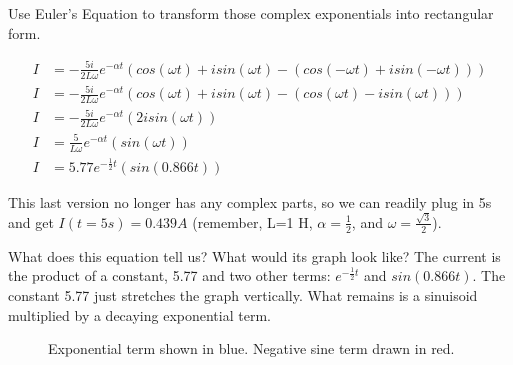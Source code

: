 Use Euler's Equation to transform those complex exponentials into rectangular form.

\begin{align*}
I&=-\frac{5i}{2L\omega}e^{-\alpha t}(cos(\omega t)+isin(\omega t)-(cos(-\omega t)+isin(-\omega t)))\\
I&=-\frac{5i}{2L\omega}e^{-\alpha t}(cos(\omega t)+isin(\omega t)-(cos(\omega t)-isin(\omega t)))\\
I&=-\frac{5i}{2L\omega}e^{-\alpha t}(2isin(\omega t))\\
I&=\frac{5}{L\omega}e^{-\alpha t}(sin(\omega t))\\
I&=5.77e^{-\frac{1}{2} t}(sin(0.866 t))
\end{align*} 

This last version no longer has any complex parts, so we can readily plug in 5s and get $I(t=5s)=0.439A$ (remember, L=1 H, $\alpha=\frac{1}{2}$, and $\omega=\frac{\sqrt{3}}{2}$).\par 

What does this equation tell us? What would its graph look like? The current is the product of a constant, 5.77 and two other terms: $e^{-\frac{1}{2}t}$ and $sin(0.866t)$. The constant 5.77 just stretches the graph vertically. What remains is a sinuisoid multiplied by a decaying exponential term. 

\begin{figure}[H]
\begin{center}
\caption{Exponential term shown in blue. Negative sine term drawn in red.}
\label{F:6RLCG2}
\end{center}
\end{figure}

